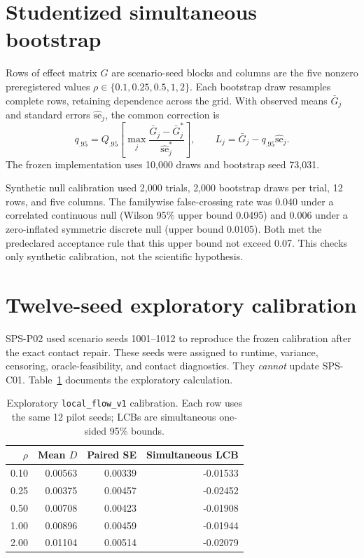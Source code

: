 \documentclass{article}
\begin{document}
\section{Studentized simultaneous bootstrap}

Rows of effect matrix \(G\) are scenario-seed blocks and columns are the five
nonzero preregistered values \(\rho\in\{0.1,0.25,0.5,1,2\}\). Each bootstrap
draw resamples complete rows, retaining dependence across the grid. With
observed means \(\bar G_j\) and standard errors
\(\widehat{\mathrm{se}}_j\), the common correction is
\[
 q_{.95}=Q_{.95}\!\left[\max_j
 \frac{\bar G_j-\bar G_j^*}{\widehat{\mathrm{se}}_j^*}\right],
 \qquad L_j=\bar G_j-q_{.95}\widehat{\mathrm{se}}_j.
\]
The frozen implementation uses 10,000 draws and bootstrap seed 73,031.

Synthetic null calibration used 2,000 trials, 2,000 bootstrap draws per trial,
12 rows, and five columns. The familywise false-crossing rate was 0.040 under a
correlated continuous null (Wilson 95\% upper bound 0.0495) and 0.006 under a
zero-inflated symmetric discrete null (upper bound 0.0105). Both met the
predeclared acceptance rule that this upper bound not exceed 0.07. This checks
only synthetic calibration, not the scientific hypothesis.

\section{Twelve-seed exploratory calibration}

SPS-P02 used scenario seeds 1001--1012 to reproduce the frozen calibration
after the exact contact repair. These seeds were assigned to runtime, variance,
censoring, oracle-feasibility, and contact diagnostics. They \emph{cannot}
update SPS-C01. Table~\ref{tab:grid} documents the exploratory calculation.

\begin{table}[ht]
\centering
\caption{Exploratory \texttt{local\_flow\_v1} calibration. Each row uses the
same 12 pilot seeds; LCBs are simultaneous one-sided 95\% bounds.}
\label{tab:grid}
\begin{tabular}{rrrr}
\toprule
\(\rho\) & Mean \(D\) & Paired SE & Simultaneous LCB \\
\midrule
0.10 & 0.00563 & 0.00339 & -0.01533 \\
0.25 & 0.00375 & 0.00457 & -0.02452 \\
0.50 & 0.00708 & 0.00423 & -0.01908 \\
1.00 & 0.00896 & 0.00459 & -0.01944 \\
2.00 & 0.01104 & 0.00514 & -0.02079 \\
\bottomrule
\end{tabular}
\end{table}
\end{document}

